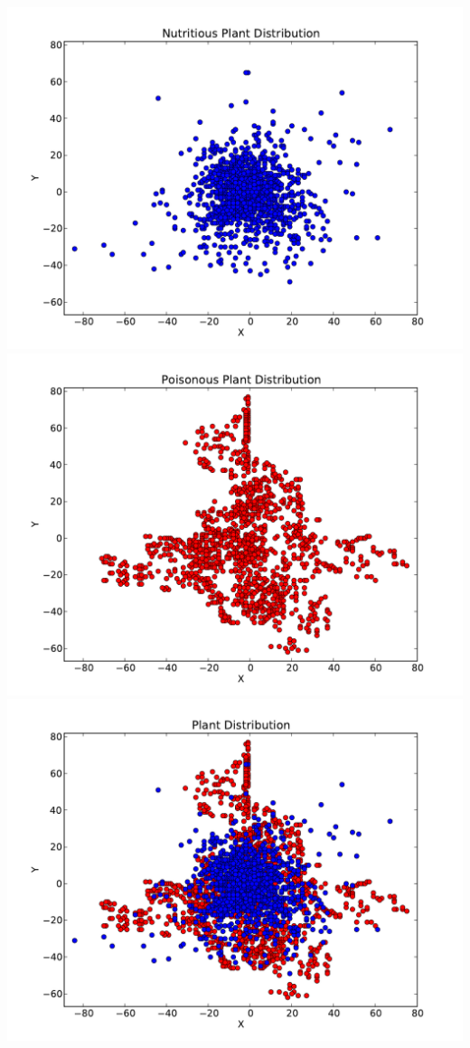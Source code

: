 \documentclass[solution, letterpaper]{cs121}
\begin{document}
\begin{center}
\includegraphics[scale=0.8]{source/nutritious-plant-distribution.pdf}
\includegraphics[scale=0.8]{source/poisonous-plant-distribution.pdf}
\includegraphics[scale=0.8]{source/plant-distribution.pdf}
\end{center}
\end{document}
